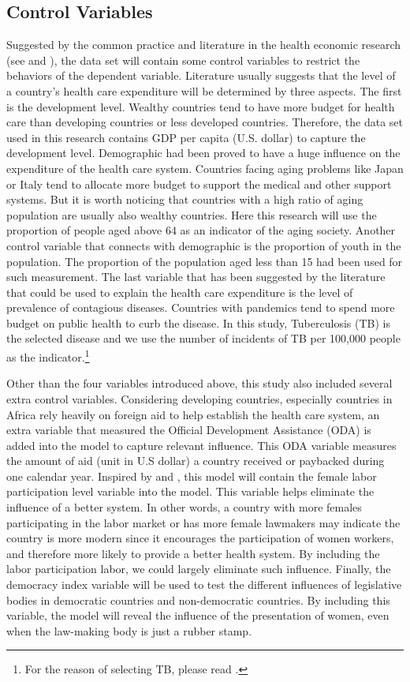 \subsection{Control Variables}
Suggested by the common practice and literature in the health economic research (see  and ), the data set will contain some control variables to restrict the behaviors of the dependent variable.
Literature usually suggests that the level of a country's health care expenditure will be determined by three aspects.
The first is the development level. 
Wealthy countries tend to have more budget for health care than developing countries or less developed countries.
Therefore, the data set used in this research contains GDP per capita (U.S. dollar) to capture the development level.
Demographic had been proved to have a huge influence on the expenditure of the health care system.
Countries facing aging problems like Japan or Italy tend to allocate more budget to support the medical and other support systems.
But it is worth noticing that countries with a high ratio of aging population are usually also wealthy countries.
Here this research will use the proportion of people aged above 64 as an indicator of the aging society.
Another control variable that connects with demographic is the proportion of youth in the population.
The proportion of the population aged less than 15 had been used for such measurement.
The last variable that has been suggested by the literature that could be used to explain the health care expenditure is the level of prevalence of contagious diseases.
Countries with pandemics tend to spend more budget on public health to curb the disease.
In this study, Tuberculosis (TB) is the selected disease and we use the number of  incidents of TB per 100,000 people as the indicator.\footnote{For the reason of selecting TB, please read .}

Other than the four variables introduced above, this study also included several extra control variables. 
Considering developing countries, especially countries in Africa rely heavily on foreign aid to help establish the health care system, an extra variable that measured the Official Development Assistance (ODA) is added into the model to capture relevant influence.
This ODA variable measures the amount of aid (unit in U.S dollar) a country received or paybacked during one calendar year.
Inspired by  and , this model will contain the female labor participation level variable into the model.
This variable helps eliminate the influence of a better system.
In other words, a country with more females participating in the labor market or has more female lawmakers may indicate the country is more modern since it encourages the participation of women workers, and therefore more likely to provide a better health system.
By including the labor participation labor, we could largely eliminate such influence.
Finally, the democracy index variable will be used to test the different influences of legislative bodies in democratic countries and non-democratic countries.
By including this variable, the model will reveal the influence of the presentation of women, even when the law-making body is just a rubber stamp.

